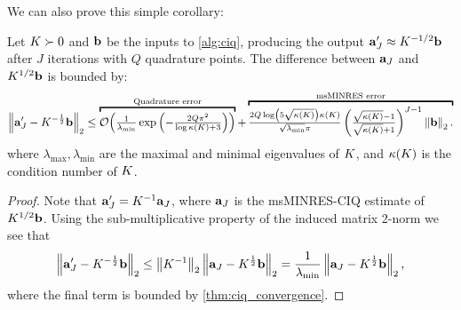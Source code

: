 We can also prove this simple corollary:
%
\begin{corollary}
  Let $K\succ 0$ and $\mathbf{b}$ be the inputs to \cref{alg:ciq}, producing the output $\mathbf{a}_J' \approx K^{-1/2} \mathbf{b}$ after $J$ iterations with $Q$ quadrature points.
  The difference between $\mathbf{a}_J$ and $K^{1/2} \mathbf{b}$ is bounded by:
  \begin{equation*}
    \left\Vert \ba_J' - \bK^{-\frac 1 2} \bb \right\Vert_2
    \leq
    \overbracket{
      \bigo{ \tfrac{1}{\lambda_\text{min}} \exp\left( -\tfrac  {2 Q \pi^2}{\log \kappa(\bK) + 3} \right)}
    }^{\text{Quadrature error}}
    +
    \overbracket{
      \tfrac{ 2 Q \log \left( 5 \sqrt{\kappa(\bK)} \right) \kappa(\bK) }{ \sqrt{\lambda_\text{min}} \pi}
      \left( \tfrac{ \sqrt{\kappa(\bK)} - 1}{ \sqrt{\kappa(\bK)} + 1} \right)^{J-1}
      \left\Vert \bb \right\Vert_2.
    }^{\text{msMINRES error}}
  \end{equation*}
  where $\lambda_\text{max},\lambda_{\text{min}}$ are the maximal and minimal eigenvalues of $K$, and $\kappa(K)$ is the condition number of $K$.
  \label{thm:ciq_convergence_inverse}
\end{corollary}

\begin{proof}
  Note that $\mathbf{a}_J' = K^{-1} \mathbf{a}_J$, where $\mathbf{a}_J$ is the msMINRES-CIQ estimate of $K^{1/2} \mathbf{b}$.
  Using the sub-multiplicative property of the induced matrix 2-norm we see that
  \[
    \left\Vert \mathbf{a}_J' - K^{-\frac 1 2} \mathbf{b} \right\Vert_2
    \leq \left\Vert K^{-1} \right\Vert_2 \left\Vert \mathbf{a}_J - K^{\frac 1 2} \mathbf{b} \right\Vert_2
    = \frac{1}{\lambda_\text{min}} \left\Vert \mathbf{a}_J - K^{\frac 1 2} \mathbf{b} \right\Vert_2,
  \]
  where the final term is bounded by \cref{thm:ciq_convergence}.
\end{proof}
